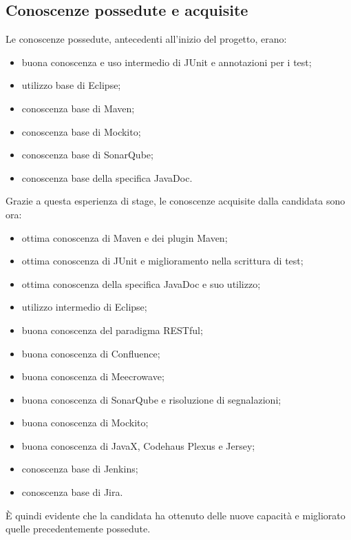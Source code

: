     \clearpage

    \subsection{Conoscenze possedute e acquisite}
    Le conoscenze possedute, antecedenti all'inizio del progetto, erano:
    \begin{itemize}
        \item buona conoscenza e uso intermedio di JUnit e annotazioni per i test;
        \item utilizzo base di Eclipse;
        \item conoscenza base di Maven;
        \item conoscenza base di Mockito;
        \item conoscenza base di SonarQube;
        \item conoscenza base della specifica JavaDoc.
    \end{itemize}
    Grazie a questa esperienza di stage, le conoscenze acquisite dalla candidata sono ora:
    \begin{itemize}
        \item ottima conoscenza di Maven e dei plugin Maven;
        \item ottima conoscenza di JUnit e miglioramento nella scrittura di test;
        \item ottima conoscenza della specifica JavaDoc e suo utilizzo;
        \item utilizzo intermedio di Eclipse;
        \item buona conoscenza del paradigma RESTful;
        \item buona conoscenza di Confluence;
        \item buona conoscenza di Meecrowave;
        \item buona conoscenza di SonarQube e risoluzione di segnalazioni;
        \item buona conoscenza di Mockito;
        \item buona conoscenza di JavaX, Codehaus Plexus e Jersey;
        \item conoscenza base di Jenkins;
        \item conoscenza base di Jira.
    \end{itemize}
    È quindi evidente che la candidata ha ottenuto delle nuove capacità e migliorato quelle precedentemente possedute.

